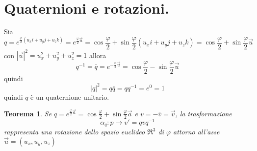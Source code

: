 \documentclass[a4paper,11pt]{article}
\newtheorem{theorem}{Teorema}
\begin{document}
\section{Quaternioni e rotazioni.}
Sia 
\begin{equation}
	q = e^{\frac{\varphi}{2} (u_x i + u_y j + u_z k)} = e^{\frac{\varphi}{2} \vec u} = \cos \frac{\varphi}{2} + \sin \frac{\varphi}{2} (u_x i + u_y j + u_z k)= \cos \frac{\varphi}{2} + \sin \frac{\varphi}{2} \vec u
\end{equation}
con $|\vec u|^2 = u_x^2+u_y^2+u_z^2= 1$ allora
\begin{equation}
	q^{-1} = \bar q = e^{-\frac{\varphi}{2} \vec u} = \cos \frac{\varphi}{2} - \sin \frac{\varphi}{2} \vec u
\end{equation}
quindi
\begin{equation}
	|q|^2 = q \bar q = q q^{-1}= e^0 = 1
\end{equation}
quindi $q$ è un quaternione unitario.

\begin{theorem}
Se $q = e^{\frac{\varphi}{2} \vec a} = \cos \frac{\varphi}{2} + \sin \frac{\varphi}{2} \vec a$ e $v = - \bar v = \vec v$,
la trasformazione
\begin{equation}
	\alpha_q : p \rightarrow v' = q v q^{-1}
\end{equation}
rappresenta una rotazione dello spazio euclideo $\Re^3$ di $\varphi$ attorno all'asse $\vec u = (u_x, u_y, u_z)$
\end{theorem}
\end{document}
